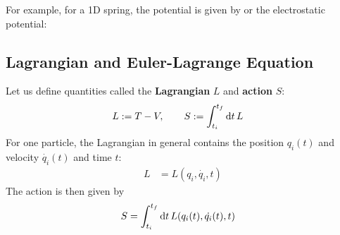 For example, for a 1D spring, the potential is given by
or the electrostatic potential:

\subsection{Lagrangian and Euler-Lagrange Equation}
Let us define quantities called the \textbf{Lagrangian} $L$ and \textbf{action} $S$:
\begin{align}
  L & := T - V, \qquad  S := \int_{t_i}^{t_f} \odif{t} \, L
\end{align}
For one particle, the Lagrangian in general contains the position $q_i(t)$ and velocity $\dot{q_i}(t)$ and time $t$:
\begin{align}
  L & = L(q_i, \dot{q_i}, t)
\end{align}
The action is then given by
\begin{align}
  S & = \int_{t_i}^{t_f} \odif{t} \, L(q_i(t), \dot{q_i}(t), t)
\end{align}


